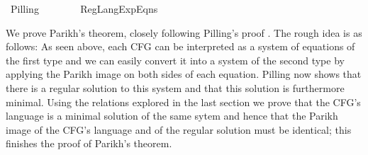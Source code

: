 %
\begin{isabellebody}%
%
%
\isadelimdocument
%
\endisadelimdocument
%
\isatagdocument
%
\isamarkuptrue%
%
\endisatagdocument
{\isafolddocument}%
%
\isadelimdocument
%
\endisadelimdocument
%
\isadelimtheory
%
\endisadelimtheory
%
\isatagtheory
{}\isamarkupfalse%
\ Pilling\isanewline
\ \ \ \isanewline
\ \ \ \ {\isachardoublequoteopen}Reg{\isacharunderscore}{\kern0pt}Lang{\isacharunderscore}{\kern0pt}Exp{\isacharunderscore}{\kern0pt}Eqns{\isachardoublequoteclose}\isanewline
{}%
\endisatagtheory
{\isafoldtheory}%
%
\isadelimtheory
%
\endisadelimtheory
%
\begin{isamarkuptext}%
We prove Parikh's theorem, closely following Pilling's proof \cite{Pilling}. The rough
idea is as follows: As seen above, each CFG can be interpreted as a system of 
equations of the first type and we can easily convert it into a system of the second type by
applying the Parikh image on both sides of each equation. Pilling now shows that there is a
regular solution to this system and that this solution is furthermore minimal.
Using the relations explored in the last section we prove that the CFG's language is a minimal
solution of the same sytem and hence that the Parikh image of the CFG's language and of the regular
solution must be identical; this finishes the proof of Parikh's theorem.


\end{isamarkuptext}
\end{isabellebody}
